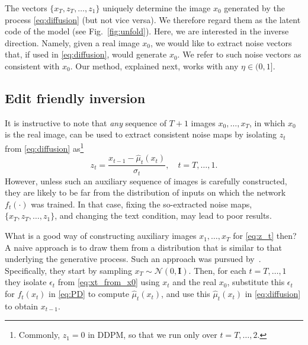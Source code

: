 The vectors $\{x_T,z_T,\ldots,z_1\}$ uniquely determine the image $x_0$ generated by the process \eqref{eq:diffusion} (but not vice versa). We therefore regard them as the latent code of the model (see Fig.~\ref{fig:unfold}). Here, we are interested in the inverse direction. Namely, given a real image $x_0$, we would like to extract noise vectors that, if used in \eqref{eq:diffusion}, would generate $x_0$. We refer to such noise vectors as consistent with $x_0$. Our method, explained next, works with any $\eta\in(0,1]$.

\subsection{Edit friendly inversion}

It is instructive to note that \emph{any} sequence of $T+1$ images $x_0,\ldots,x_T$, in which $x_0$ is the real image, can be used to extract consistent noise maps by isolating $z_t$ from \eqref{eq:diffusion} as\footnote{Commonly, $z_1=0$ in DDPM, so that we run only over $t=T,\ldots,2$.} 
\begin{equation}
\label{eq:z_t}
z_t = \dfrac{x_{t-1} -\hat\mu_t(x_t)}{\sigma_t},\quad t=T,\ldots,1.
\end{equation}
However, unless such an auxiliary sequence of images is carefully constructed, they are likely to be far from the distribution of inputs on which the network $f_t(\cdot)$ was trained. In that case, fixing the so-extracted noise maps, $\{x_T,z_T,\ldots,z_1\}$, and changing the text condition, may lead to poor results.

What is a good way of constructing auxiliary images $x_1,\ldots,x_T$ for \eqref{eq:z_t} then? A naive approach is to draw them from a distribution that is similar to that underlying the generative process. Such an approach was pursued by~\cite{Wu22}. Specifically, they start by sampling  $x_T \sim \mathcal{N}(0,\mathbf{I})$. Then, for each $t=T,\ldots,1$ they isolate $\epsilon_t$ from \eqref{eq:xt_from_x0} using $x_t$ and the real $x_0$, substitute this $\epsilon_t$ for $f_t(x_t)$ in \eqref{eq:PD} to compute $\hat{\mu}_t(x_t)$, and use this $\hat{\mu}_t(x_t)$ in \eqref{eq:diffusion} to obtain $x_{t-1}$.

